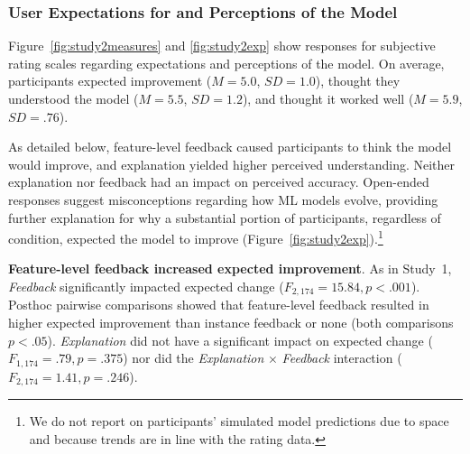 \subsubsection{User Expectations for and Perceptions of the Model}
Figure~\ref{fig:study2measures} and \ref{fig:study2exp} show responses for subjective rating scales regarding expectations and perceptions of the model. On average, participants expected improvement ($M=5.0$, $SD=1.0$), thought they understood the model ($M=5.5$, $SD=1.2$), and thought it worked well ($M=5.9$, $SD=.76$).

As detailed below, feature-level feedback caused participants to think the model would improve, and explanation yielded higher perceived understanding. Neither explanation nor feedback had an impact on perceived accuracy. Open-ended responses suggest misconceptions regarding how ML models evolve, providing further explanation for why a substantial portion of participants, regardless of condition, expected the model to improve (Figure~\ref{fig:study2exp}).\footnote{We do not report on participants' simulated model predictions due to space and because trends are in line with the rating data.}  

\textbf{Feature-level feedback increased expected improvement}.
%
As in Study~1, \textit{Feedback} significantly impacted expected change ($F_{2,174}=15.84, p < .001$). Posthoc pairwise comparisons showed that feature-level feedback resulted in higher expected improvement than instance feedback or none (both comparisons $p<.05$). \textit{Explanation} did not have a significant impact on expected change ($F_{1,174}=.79, p=.375$) nor did the \textit{Explanation} $\times$ \textit{Feedback} interaction ($F_{2,174}=1.41, p=.246$).

%

